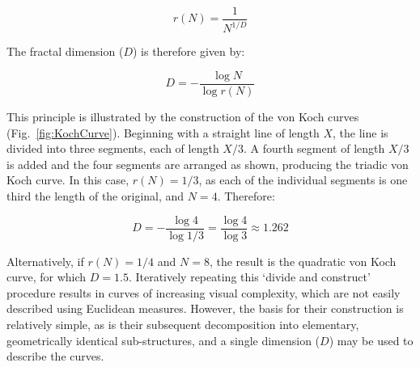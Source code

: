 \begin{equation}
	r(N) = \frac{1}{N^{1/D}}
\end{equation}

\noindent The fractal dimension ($D$) is therefore given by:

\begin{equation}
	D = -\frac{\log N}{\log r(N)}
\end{equation}

\noindent This principle is illustrated by the construction of the von Koch curves (Fig.~\ref{fig:KochCurve}). Beginning with a straight line of length $X$, the line is divided into three segments, each of length $X/3$. A fourth segment of length $X/3$ is added and the four segments are arranged as shown, producing the triadic von Koch curve. In this case, $r(N)=1/3$, as each of the individual segments is one third the length of the original, and $N=4$. Therefore:

$$D = - \frac{\log 4}{\log 1/3} = \frac{\log 4}{\log 3} \approx 1.262$$

\noindent Alternatively, if $r(N)=1/4$ and $N=8$, the result is the quadratic von Koch curve, for which $D = 1.5$. Iteratively repeating this \lq divide and construct' procedure results in curves of increasing visual complexity, which are not easily described using Euclidean measures. However, the basis for their construction is relatively simple, as is their subsequent decomposition into elementary, geometrically identical sub-structures, and a single dimension ($D$) may be used to describe the curves.


